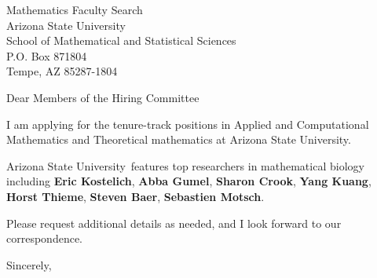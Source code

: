 




	
	
	\def\School{Arizona State University}
	
	\begin{letter}
		{Mathematics Faculty Search\\
			Arizona State University\\
			School of Mathematical and Statistical Sciences\\
			P.O. Box 871804\\
			Tempe, AZ 85287-1804
		}
		
		\opening{Dear Members of the Hiring Committee}
		
		
		I am applying for the tenure-track positions in Applied and Computational Mathematics and Theoretical mathematics at \School. 
		
		
		
		\School~features top researchers in mathematical biology including \textbf{Eric Kostelich}, \textbf{Abba Gumel}, \textbf{Sharon Crook}, \textbf{Yang Kuang}, \textbf{Horst Thieme}, \textbf{Steven Baer}, \textbf{Sebastien Motsch}. 
		
		
		
		
		
		Please request additional details as needed, and I look forward to our correspondence.
		
		\closing{Sincerely,}
	\end{letter}

